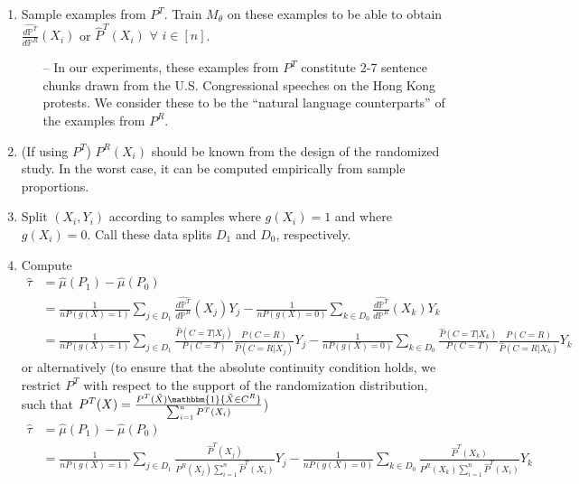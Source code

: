 \documentclass{article}
\newcommand{\vl}[1]{\textcolor{orange}{[VL: #1]}}
\begin{document}
\begin{enumerate}
    \item Sample examples from $P^T$. Train $M_\theta$ on these examples to be able to obtain $\frac{\hat{d \mathbb{P}^T}}{d \mathbb{P}^R}(X_i)$ or $\hat{P}^T(X_i)$ $\forall$ $i \in [n]$.
    \begin{itemize}
        \item[--] In our experiments, these examples from $P^T$ constitute 2-7 sentence chunks drawn from the U.S. Congressional speeches on the Hong Kong protests. We consider these to be the ``natural language counterparts'' of the examples from $P^R$.
    \end{itemize}
    \item (If using $P^T$) $P^R(X_i)$ should be known from the design of the randomized study. In the worst case, it can be computed empirically from sample proportions.
    \item Split $(X_i,Y_i)$ according to samples where $g(X_i)=1$ and where $g(X_i)=0$. Call these data splits $D_1$ and $D_0$, respectively.
    \item Compute
    \begin{equation*}
        \begin{split}
            \hat{\tau} &= \hat{\mu}(P_1) - \hat{\mu}(P_0) \\
            &= \frac{1}{nP(g(X)=1)} \sum_{j \in D_1} \frac{\hat{d \mathbb{P}^T}}{d \mathbb{P}^R}(X_j)Y_j - \frac{1}{nP(g(X)=0)} \sum_{k \in D_0} \frac{\hat{d \mathbb{P}^T}}{d \mathbb{P}^R}(X_k)Y_k \\
            &= \frac{1}{nP(g(X)=1)} \sum_{j \in D_1} \frac{\hat{P}(C=T|X_j)}{P(C=T)}\frac{P(C=R)}{\hat{P}(C=R|X_j)}Y_j - \frac{1}{nP(g(X)=0)} \sum_{k \in D_0} \frac{\hat{P}(C=T|X_k)}{P(C=T)}\frac{P(C=R)}{\hat{P}(C=R|X_k)}Y_k
        \end{split}
    \end{equation*}
    or alternatively (to ensure that the absolute continuity condition holds, we restrict $P^T$ with respect to the support of the randomization distribution, such that $P^T(X) = \frac{P^T(\tilde{X})\mathbbm{1}\{\tilde{X} \in C^R\}}{\sum_{i=1}^n P^T(X_i)}$)
    \begin{equation*}
        \begin{split}
            \hat{\tau} &= \hat{\mu}(P_1) - \hat{\mu}(P_0) \\
            &= \frac{1}{n P(g(X)=1)} \sum_{j \in D_1} \frac{\hat{P}^T(X_j)}{P^R(X_j)\sum_{i=1}^n \hat{P}^T(X_i)}Y_j - \frac{1}{nP(g(X)=0)} \sum_{k \in D_0} \frac{\hat{P}^T(X_k)}{P^R(X_k)\sum_{i=1}^n \hat{P}^T(X_i)}Y_k
        \end{split}
    \end{equation*}
    

\end{enumerate}
\end{document}

